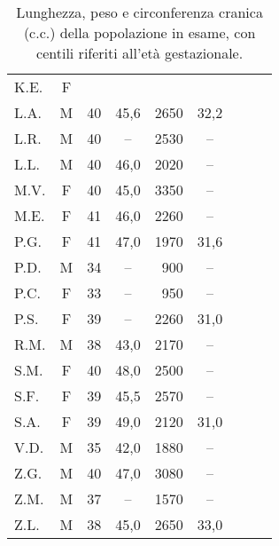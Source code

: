 \begin{table}[!h]
\begin{center}
\begin{tabular}{lcccrcrrr}
K.E.	& F	& & & & & & &  \\
L.A.	& M	& 40 & 45,6 & 2650 & 32,2   & & &  \\
L.R.	& M	& 40 & --   & 2530 & --     & & &  \\
L.L.	& M	& 40 & 46,0 & 2020 & --     & & &  \\
M.V.	& F	& 40 & 45,0 & 3350 & --     & & &  \\
M.E.	& F	& 41 & 46,0 & 2260 & --     & & &  \\
P.G.	& F	& 41 & 47,0 & 1970 & 31,6   & & &  \\
P.D.	& M	& 34 & --   &  900 & --     & &  \\
P.C.	& F	& 33 & --   &  950 & --     & & &  \\
P.S.	& F	& 39 & --   & 2260 & 31,0   & & &  \\
R.M.	& M	& 38 & 43,0 & 2170 & --     & & &  \\
S.M.	& F	& 40 & 48,0 & 2500 & --     & & &  \\
S.F.	& F	& 39 & 45,5 & 2570 & --     & & &  \\
S.A.	& F	& 39 & 49,0 & 2120 & 31,0   & & &  \\
V.D.	& M	& 35 & 42,0 & 1880 & --     & & &  \\
Z.G.	& M	& 40 & 47,0 & 3080 & --     & & &  \\
Z.M.	& M	& 37 & --   & 1570 & --     & & &  \\
Z.L.	& M	& 38 & 45,0 & 2650 & 33,0   & & &  \\
\bottomrule
\end{tabular}
\end{center}
\caption{Lunghezza, peso e circonferenza cranica (c.c.) della popolazione in esame, con centili riferiti all'età gestazionale.}
\label{tab:VariabiliNeonatali}
\end{table}


